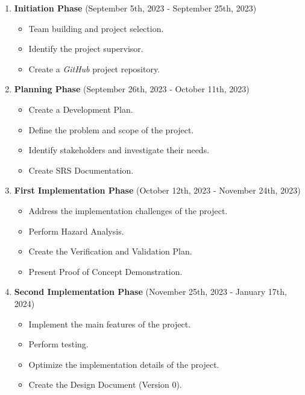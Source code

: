 \documentclass[12pt]{article}
\begin{document}
    \begin{enumerate}
      \item \textbf{Initiation Phase} (September 5th, 2023 - September 25th, 2023)
      \begin{itemize}
        \item Team building and project selection.
        \item Identify the project supervisor.
        \item Create a \textit{GitHub} project repository.
      \end{itemize}
    
      \item \textbf{Planning Phase} (September 26th, 2023 - October 11th, 2023)
      \begin{itemize}
        \item Create a Development Plan.
        \item Define the problem and scope of the project.
        \item Identify stakeholders and investigate their needs.
        \item Create SRS Documentation.
      \end{itemize}
    
      \item \textbf{First Implementation Phase} (October 12th, 2023 - November 24th, 2023)
      \begin{itemize}
        \item Address the implementation challenges of the project.
        \item Perform Hazard Analysis.
        \item Create the Verification and Validation Plan.
        \item Present Proof of Concept Demonstration.
      \end{itemize}
      
      \item \textbf{Second Implementation Phase} (November 25th, 2023 - January 17th, 2024)
      \begin{itemize}
        \item Implement the main features of the project.
        \item Perform testing.
        \item Optimize the implementation details of the project.
        \item Create the Design Document (Version 0).
      \end{itemize}
    

\end{enumerate}
\end{document}
